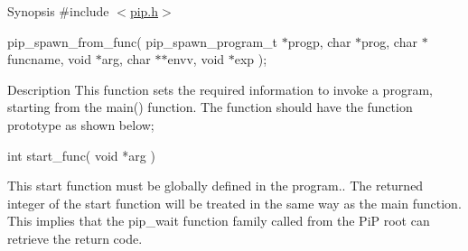 \documentclass[twoside]{book}
\begin{document}
\begin{DoxyParagraph}{Synopsis}
\#include $<$\hyperlink{pip_8h_source}{pip.\-h}$>$ \par
pip\-\_\-spawn\-\_\-from\-\_\-func( pip\-\_\-spawn\-\_\-program\-\_\-t $\ast$progp, char $\ast$prog, char $\ast$funcname, void $\ast$arg, char $\ast$$\ast$envv, void $\ast$exp );
\end{DoxyParagraph}
\begin{DoxyParagraph}{Description}
This function sets the required information to invoke a program, starting from the {\ttfamily main()} function. The function should have the function prototype as shown below; 
\begin{DoxyCode}
\textcolor{keywordtype}{int} start\_func( \textcolor{keywordtype}{void} *arg )
\end{DoxyCode}
 This start function must be globally defined in the program.. The returned integer of the start function will be treated in the same way as the {\ttfamily main} function. This implies that the {\ttfamily pip\-\_\-wait} function family called from the Pi\-P root can retrieve the return code.
\end{DoxyParagraph}
\end{document}
